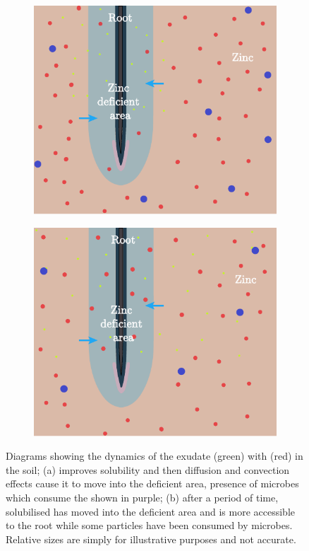 \documentclass[11pt]{article}
\numberwithin{equation}{section}
\begin{document}
\begin{figure}[ht]
\centering
\begin{subfigure}[t]{0.35\textwidth}
    \includegraphics[width=\textwidth]{Figures/RootZincDiagram.pdf}
    \caption{}
\end{subfigure}
\qquad
\begin{subfigure}[t]{0.35\textwidth}
    \includegraphics[width=\textwidth]{Figures/RootZincDiagram2.pdf}
    \caption{}
\end{subfigure}
\caption{Diagrams showing the dynamics of the exudate  (green) with  (red) in the soil; (a)  improves  solubility and then diffusion and convection effects cause it to move into the deficient area, presence of microbes which consume the  shown in purple; (b) after a period of time, solubilised  has moved into the deficient area and is more accessible to the root while some  particles have been consumed by microbes. Relative sizes are simply for illustrative purposes and not accurate.}
\label{fig:Zinc}
\end{figure}
\end{document}
